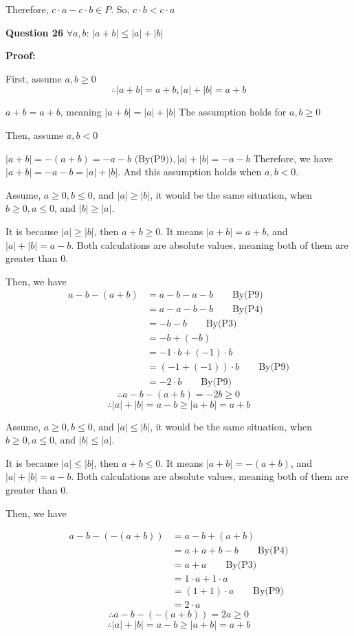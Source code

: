 \documentclass[a4paper,12pt]{report}
\begin{document}
\noindent
Therefore, $c\cdot{a}-c\cdot{b}\in P$. So, $c\cdot{b}<c\cdot{a}$

\noindent
\textbf{Question 26} $\forall a,b$: $|a+b|\leq|a|+|b|$

\noindent
\textbf{Proof:}

\noindent
First, assume $a,b \geq 0$
\[\therefore |a+b| = a+b, |a|+|b|=a+b\]

\noindent
$a+b=a+b$, meaning $|a+b|=|a|+|b|$ The assumption holds for $a,b\geq 0$

\noindent
Then, assume $a,b < 0$

\noindent
$|a+b| = -(a+b)=-a-b\text{ (By(P9))}, |a|+|b| = -a-b$
Therefore, we have $|a+b|=-a-b=|a|+|b|$. And this assumption holds when $a,b < 0$.

\noindent
Assume, $a\geq 0, b\leq 0$, and $|a|\geq|b|$, it would be the same situation, when $b\geq 0, a\leq 0$, and $|b|\geq|a|$.

\noindent 
It is because $|a|\geq|b|$, then $a+b\geq0$. It means $|a+b| =a+b$, and $|a|+|b|=a-b$. Both calculations are absolute values, meaning both of them are greater than 0. 

\noindent
Then, we have  
\begin{align*}
 a-b-(a+b) & = a-b-a-b\qquad\text{By(P9)}\\
 & =a-a-b-b\qquad \text{By(P4)}\\
 & =-b-b\qquad \text{By(P3)}\\
 & =-b+(-b)\\
 & =-1\cdot{b}+(-1)\cdot{b}\\
 & =(-1+(-1))\cdot{b}\qquad \text{By(P9)}\\
 & =-2\cdot{b}\qquad \text{By(P9)}
\end{align*}
\[\therefore a-b-(a+b)=-2b\geq0\]
\[\therefore |a|+|b|=a-b\geq |a+b|=a+b\]

\noindent
Assume, $a\geq 0, b\leq 0$, and $|a|\leq|b|$, it would be the same situation, when $b\geq 0, a\leq 0$, and $|b|\leq|a|$.


\noindent 
It is because $|a|\leq|b|$, then $a+b\leq0$. It means $|a+b| =-(a+b)$, and $|a|+|b|=a-b$. Both calculations are absolute values, meaning both of them are greater than 0. 

Then, we have

\begin{align*}
 a-b-(-(a+b)) & = a-b+(a+b)\\
 & =a+a+b-b\qquad \text{By(P4)}\\
 & =a+a\qquad \text{By(P3)}\\
 & =1\cdot{a}+1\cdot{a}\\
 & =(1+1)\cdot{a}\qquad \text{By(P9)}\\
 & =2\cdot{a}
\end{align*}
\[\therefore a-b-(-(a+b))=2a\geq0\]
\[\therefore |a|+|b|=a-b\geq |a+b|=a+b\]\\
\end{document}
